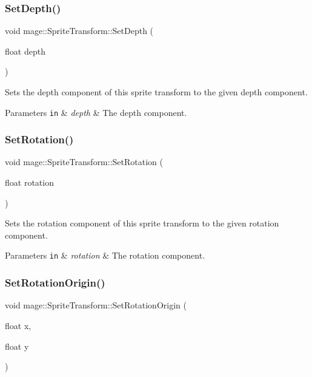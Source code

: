\subsubsection{\texorpdfstring{Set\+Depth()}{SetDepth()}}
{\footnotesize\ttfamily void mage\+::\+Sprite\+Transform\+::\+Set\+Depth (\begin{DoxyParamCaption}\item[{float}]{depth }\end{DoxyParamCaption})}

Sets the depth component of this sprite transform to the given depth component.


\begin{DoxyParams}[1]{Parameters}
\mbox{\tt in}  & {\em depth} & The depth component. \\
\hline
\end{DoxyParams}
\hypertarget{structmage_1_1_sprite_transform_a23921afd58b631f297328cf2b34d5c40}{}\label{structmage_1_1_sprite_transform_a23921afd58b631f297328cf2b34d5c40} 
\subsubsection{\texorpdfstring{Set\+Rotation()}{SetRotation()}}
{\footnotesize\ttfamily void mage\+::\+Sprite\+Transform\+::\+Set\+Rotation (\begin{DoxyParamCaption}\item[{float}]{rotation }\end{DoxyParamCaption})}

Sets the rotation component of this sprite transform to the given rotation component.


\begin{DoxyParams}[1]{Parameters}
\mbox{\tt in}  & {\em rotation} & The rotation component. \\
\hline
\end{DoxyParams}
\hypertarget{structmage_1_1_sprite_transform_a48e720840181b0da09989b739102c294}{}\label{structmage_1_1_sprite_transform_a48e720840181b0da09989b739102c294} 
\subsubsection{\texorpdfstring{Set\+Rotation\+Origin()}{SetRotationOrigin()}\hspace{0.1cm}{\footnotesize\ttfamily [1/2]}}
{\footnotesize\ttfamily void mage\+::\+Sprite\+Transform\+::\+Set\+Rotation\+Origin (\begin{DoxyParamCaption}\item[{float}]{x,  }\item[{float}]{y }\end{DoxyParamCaption})}

